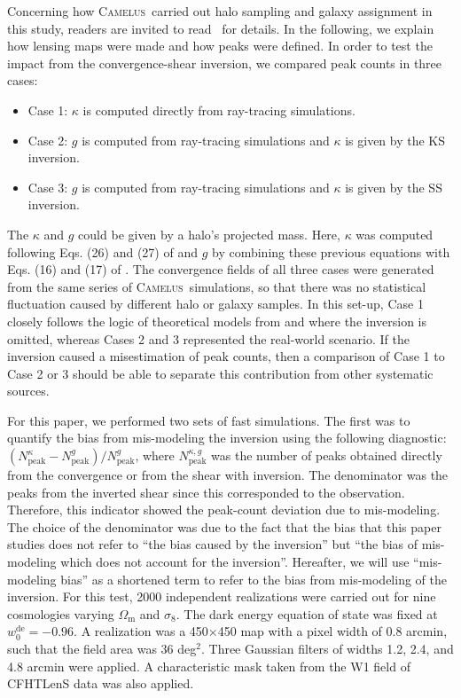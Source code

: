 \documentclass{aa} %
\newcommand{\OmegaM}{\Omega_\mathrm{m}}
\newcommand{\sigEig}{\sigma_8}
\newcommand{\wZero}{w_0^\mathrm{de}}
\newcommand{\peak}{\mathrm{peak}}
\newcommand{\PaperIII}{\citetalias{Lin_etal_2016a}}
\newcommand{\Camelus}{\textsc{Camelus}}
\begin{document}
Concerning how \Camelus\ carried out halo sampling and galaxy assignment in this study, readers are invited to read \PaperIII\ for details. In the following, we explain how lensing maps were made and how peaks were defined.
In order to test the impact from the convergence-shear inversion, we compared peak counts in three cases:
\begin{itemize}
        \item Case 1: $\kappa$ is computed directly from ray-tracing simulations.
        \item Case 2: $g$ is computed from ray-tracing simulations and $\kappa$ is given by the KS inversion.
        \item Case 3: $g$ is computed from ray-tracing simulations and $\kappa$ is given by the SS inversion.
\end{itemize}
The $\kappa$ and $g$ could be given by a halo's projected mass. Here, $\kappa$ was computed following Eqs. (26) and (27) of \citet{Takada_Jain_2003a} and $g$ by combining these previous equations with Eqs. (16) and (17) of \citet{Takada_Jain_2003b}. The convergence fields of all three cases were generated from the same series of \Camelus\ simulations, so that there was no statistical fluctuation caused by different halo or galaxy samples. In this set-up, Case 1 closely follows the logic of theoretical models from \citet{Fan_etal_2010} and \citet{Shirasaki_2017} where the inversion is omitted, whereas Cases 2 and 3 represented the real-world scenario. If the inversion caused a misestimation of peak counts, then a comparison of Case 1 to Case 2 or 3 should be able to separate this contribution from other systematic sources.

For this paper, we performed two sets of fast simulations. The first was to quantify the bias from mis-modeling the inversion using the following diagnostic: $(N_\peak^\kappa - N_\peak^g) / N_\peak^g$, where $N_\peak^{\kappa,g}$ was the number of peaks obtained directly from the convergence or from the shear with inversion. The denominator was the peaks from the inverted shear since this corresponded to the observation. Therefore, this indicator showed the peak-count deviation due to mis-modeling. The choice of the denominator was due to the fact that the bias that this paper studies does not refer to ``the bias caused by the inversion'' but ``the bias of mis-modeling which does not account for the inversion''. Hereafter, we will use ``mis-modeling bias'' as a shortened term to refer to the bias from mis-modeling of the inversion. For this test, 2000 independent realizations were carried out for nine cosmologies varying $\OmegaM$ and $\sigEig$. The dark energy equation of state was fixed at $\wZero=-0.96$. A realization was a 450$\times$450 map with a pixel width of 0.8 arcmin, such that the field area was 36 deg$^2$. Three Gaussian filters of widths 1.2, 2.4, and 4.8 arcmin were applied. A characteristic mask taken from the W1 field of CFHTLenS data was also applied.
\end{document}
